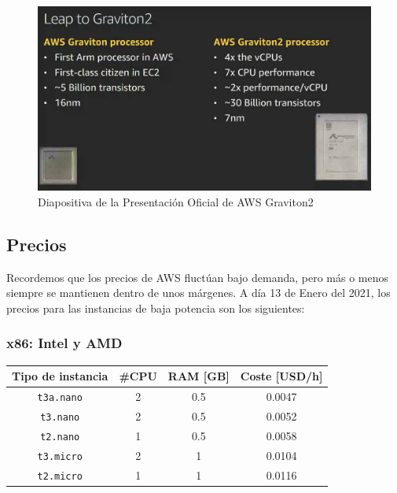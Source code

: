 \documentclass[a4paper,openright,12pt]{article}
\begin{document}
\begin{figure}[h]
\includegraphics[width=\textwidth]{img/aws-graviton2-slide.png}
\caption{Diapositiva de la Presentación Oficial de AWS Graviton2}
\label{fig:aws-graviton2-slide}
\end{figure}


\subsection{Precios}
Recordemos que los precios de AWS fluctúan bajo demanda, pero más o menos siempre se mantienen dentro de unos márgenes.
A día 13 de Enero del 2021, los precios para las instancias de baja potencia son los siguientes:
\subsubsection{x86: Intel y AMD}
\begin{center}
\begin{tabular}{ | c | c | c | c | }
    \hline
    Tipo de instancia       &   \#CPU   &   RAM [GB]    &   Coste [USD/h]   \\
    \hline
    \texttt{t3a.nano}       &   2       &   0.5         &   0.0047          \\
    \hline
    \texttt{t3.nano}        &   2       &   0.5         &   0.0052          \\
    \hline
    \texttt{t2.nano}        &   1       &   0.5         &   0.0058          \\
    \hline
    \texttt{t3.micro}       &   2       &   1           &   0.0104          \\
    \hline
    \texttt{t2.micro}       &   1       &   1           &   0.0116          \\
    \hline
\end{tabular}
\end{center}
\end{document}
